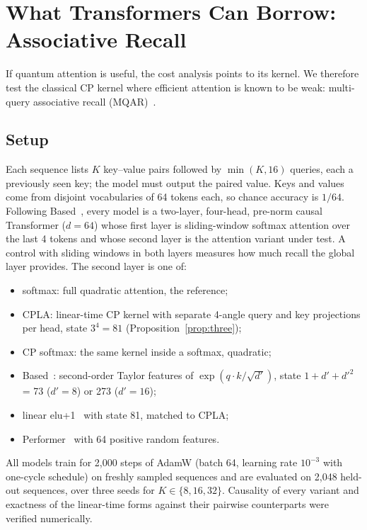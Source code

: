 \documentclass[conference]{IEEEtran}
\theoremstyle{definition}
\newcommand{\cpla}{CPLA}
\begin{document}
\section{What Transformers Can Borrow: Associative Recall}
\label{sec:recall}

If quantum attention is useful, the cost analysis points to its kernel. We therefore test the classical CP kernel where efficient attention is known to be weak: multi-query associative recall (MQAR)~\cite{arora2024zoology}.

\subsection{Setup}
Each sequence lists $K$ key--value pairs followed by $\min(K,16)$ queries, each a previously seen key; the model must output the paired value. Keys and values come from disjoint vocabularies of 64 tokens each, so chance accuracy is $1/64$. Following Based~\cite{arora2024based}, every model is a two-layer, four-head, pre-norm causal Transformer ($d=64$) whose first layer is sliding-window softmax attention over the last 4 tokens and whose second layer is the attention variant under test. A control with sliding windows in both layers measures how much recall the global layer provides. The second layer is one of:
\begin{itemize}
  \item softmax: full quadratic attention, the reference;
  \item \cpla: linear-time CP kernel with separate 4-angle query and key projections per head, state $3^4=81$ (Proposition~\ref{prop:three});
  \item CP softmax: the same kernel inside a softmax, quadratic;
  \item Based~\cite{arora2024based}: second-order Taylor features of $\exp(q\cdot k/\sqrt{d'})$, state $1+d'+d'^2$ = 73 ($d'=8$) or 273 ($d'=16$);
  \item linear elu+1~\cite{katharopoulos2020linear} with state 81, matched to \cpla;
  \item Performer~\cite{choromanski2021performer} with 64 positive random features.
\end{itemize}
All models train for 2{,}000 steps of AdamW (batch 64, learning rate $10^{-3}$ with one-cycle schedule) on freshly sampled sequences and are evaluated on 2{,}048 held-out sequences, over three seeds for $K\in\{8,16,32\}$. Causality of every variant and exactness of the linear-time forms against their pairwise counterparts were verified numerically.
\end{document}
